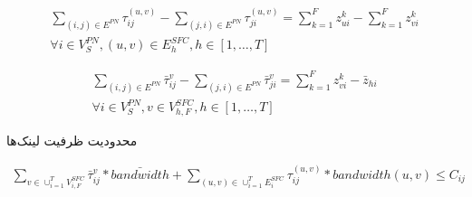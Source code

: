 \begin{latin}\begin{align}
    \sum_{(i,j) \in E^{PN}} \tau_{ij}^{(u,v)} - \sum_{(j,i) \in E^{PN}} \tau_{ji}^{(u,v)} = \sum_{k=1}^{F} z_{ui}^{k} - \sum_{k=1}^{F} z_{vi}^{k} \nonumber \\
    \forall i \in V_{S}^{PN}, (u,v) \in E_{h}^{SFC}, h \in [1,\ldots, T]
\end{align}\end{latin}
\begin{latin}\begin{align}
    \sum_{(i,j) \in E^{PN}} \bar{\tau}_{ij}^{v} - \sum_{(j,i) \in E^{PN}} \bar{\tau}_{ji}^{v} = \sum_{k=1}^{F} z_{vi}^{k} - \bar{z}_{hi} \nonumber \\
    \forall i \in V_{S}^{PN}, v \in V_{h, F}^{SFC}, h \in [1,\ldots, T]
\end{align}\end{latin}

محدودیت ظرفیت لینک‌ها
\begin{latin}\begin{align}
    \sum_{v \in \cup_{i=1}^{T} V_{i,F}^{SFC}} \bar{\tau}_{ij}^{v} * \bar{bandwidth} + \sum_{(u,v) \in \cup_{i=1}^{T} E_{i}^{SFC}} \tau_{ij}^{(u,v)} * bandwidth(u,v) \le C_{ij}
\end{align}\end{latin}